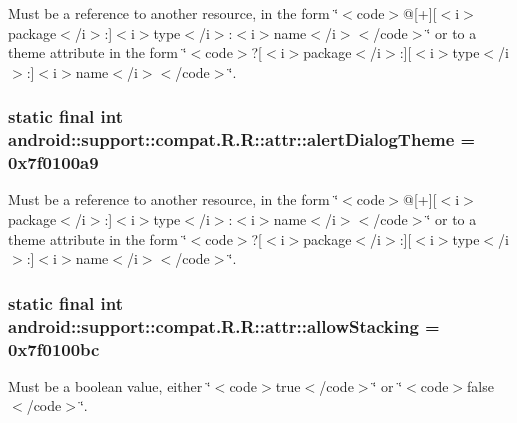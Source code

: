 Must be a reference to another resource, in the form \char`\"{}$<$code$>$@\mbox{[}+\mbox{]}\mbox{[}$<$i$>$package$<$/i$>$:\mbox{]}$<$i$>$type$<$/i$>$:$<$i$>$name$<$/i$>$$<$/code$>$\char`\"{} or to a theme attribute in the form \char`\"{}$<$code$>$?\mbox{[}$<$i$>$package$<$/i$>$:\mbox{]}\mbox{[}$<$i$>$type$<$/i$>$:\mbox{]}$<$i$>$name$<$/i$>$$<$/code$>$\char`\"{}. \hypertarget{classandroid_1_1support_1_1compat_1_1_r_1_1attr_3cb40be513101807fa13c9b985cf1f80}{
\subsubsection[{alertDialogTheme}]{\setlength{\rightskip}{0pt plus 5cm}static final int android::support::compat.R.R::attr::alertDialogTheme = 0x7f0100a9}}
\label{classandroid_1_1support_1_1compat_1_1_r_1_1attr_3cb40be513101807fa13c9b985cf1f80}


Must be a reference to another resource, in the form \char`\"{}$<$code$>$@\mbox{[}+\mbox{]}\mbox{[}$<$i$>$package$<$/i$>$:\mbox{]}$<$i$>$type$<$/i$>$:$<$i$>$name$<$/i$>$$<$/code$>$\char`\"{} or to a theme attribute in the form \char`\"{}$<$code$>$?\mbox{[}$<$i$>$package$<$/i$>$:\mbox{]}\mbox{[}$<$i$>$type$<$/i$>$:\mbox{]}$<$i$>$name$<$/i$>$$<$/code$>$\char`\"{}. \hypertarget{classandroid_1_1support_1_1compat_1_1_r_1_1attr_c13fd08dce35ed9010f23027a299155f}{
\subsubsection[{allowStacking}]{\setlength{\rightskip}{0pt plus 5cm}static final int android::support::compat.R.R::attr::allowStacking = 0x7f0100bc}}
\label{classandroid_1_1support_1_1compat_1_1_r_1_1attr_c13fd08dce35ed9010f23027a299155f}


Must be a boolean value, either \char`\"{}$<$code$>$true$<$/code$>$\char`\"{} or \char`\"{}$<$code$>$false$<$/code$>$\char`\"{}. 

